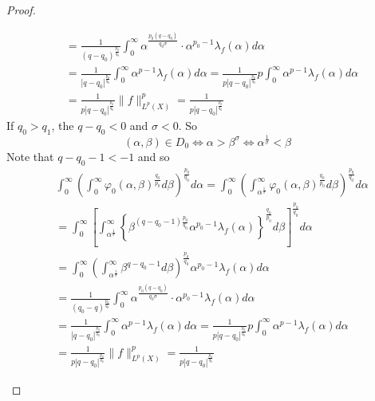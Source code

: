 \begin{proof}
\begin{enumerate}[label=(\Roman*)]
\begin{equation*}
\begin{aligned}
				& =\frac{1}{\left(q-q_0\right)^{\frac{p_0}{q_0}}} \int_0^{\infty} \alpha^{\frac{p_0\left(q-q_0\right)}{q_0 \sigma}} \cdot \alpha^{p_0-1} \lambda_f(\alpha) d \alpha \\
				& =\frac{1}{\left|q-q_0\right|^{\frac{p_0}{q_0}}} \int_0^{\infty} \alpha^{p-1} \lambda_f(\alpha) d \alpha=\frac{1}{p\left|q-q_0\right|^{\frac{p_0}{q_0}}} p \int_0^{\infty} \alpha^{p-1} \lambda_f(\alpha) d \alpha \\
				& =\frac{1}{p\left|q-q_0\right|^{\frac{p_0}{q_0}}}\|f\|_{L^p(X)}^p=\frac{1}{p\left|q-q_0\right|^{\frac{p_0}{q_0}}}
			\end{aligned}
		\end{equation*}
		If $q_0 > q_1$, the $q - q_0 < 0$ and $\sigma < 0$. So
		\begin{equation*}
			(\alpha, \beta) \in D_0 \Longleftrightarrow \alpha>\beta^\sigma \Longleftrightarrow \alpha^{\frac{1}{\sigma}}<\beta
		\end{equation*}
		Note that $q -q_0 -1 < -1$ and so
		\begin{equation*}
			\begin{aligned}
				& \int_0^{\infty}\left(\int_0^{\infty} \varphi_0(\alpha, \beta)^{\frac{q_0}{p_0}} d \beta\right)^{\frac{p_0}{q_0}} d \alpha=\int_0^{\infty}\left(\int_{\alpha^{\frac{1}{\sigma}}}^{\infty} \varphi_0(\alpha, \beta)^{\frac{q_0}{p_0}} d \beta\right)^{\frac{p_0}{q_0}} d \alpha \\
				& =\int_0^{\infty}\left[\int_{\alpha^{\frac{1}{\sigma}}}^{\infty}\left\{\beta^{\left(q-q_0-1\right) \frac{p_0}{q_0}} \alpha^{p_0-1} \lambda_f(\alpha)\right\}^{\frac{q_0}{p_0}} d \beta\right]^{\frac{p_0}{q_0}} d \alpha \\
				& =\int_0^{\infty}\left(\int_{\alpha^{\frac{1}{\sigma}}}^{\infty} \beta^{q-q_0-1} d \beta\right)^{\frac{p_0}{q_0}} \alpha^{p_0-1} \lambda_f(\alpha) d \alpha \\
				& =\frac{1}{\left(q_0-q\right)^{\frac{p_0}{q_0}}} \int_0^{\infty} \alpha^{\frac{p_0\left(q-q_0\right)}{q_0 \sigma}} \cdot \alpha^{p_0-1} \lambda_f(\alpha) d \alpha \\
				& =\frac{1}{\left|q-q_0\right|^{\frac{p_0}{q_0}}} \int_0^{\infty} \alpha^{p-1} \lambda_f(\alpha) d \alpha=\frac{1}{p\left|q-q_0\right|^{\frac{p_0}{q_0}}} p \int_0^{\infty} \alpha^{p-1} \lambda_f(\alpha) d \alpha \\
				& =\frac{1}{p\left|q-q_0\right|^{\frac{p_0}{q_0}}}\|f\|_{L^p(X)}^p=\frac{1}{p\left|q-q_0\right|^{\frac{p_0}{q_0}}}
			\end{aligned}
		\end{equation*}

\end{enumerate}
\end{proof}
